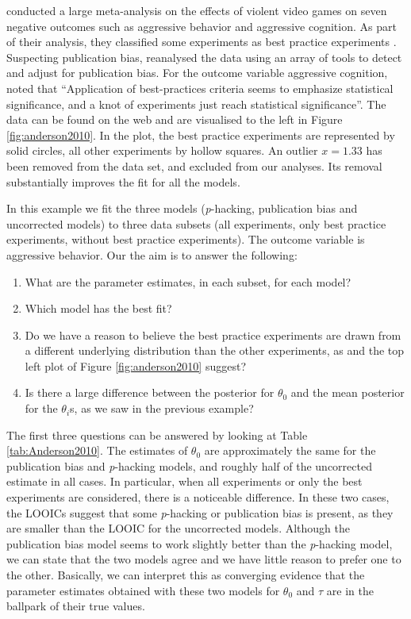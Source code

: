 \documentclass{article}
\theoremstyle{plain}
\theoremstyle{definition}
\begin{document}
\citet{anderson2010violent} conducted a large meta-analysis on the effects of violent video games on seven negative outcomes such as aggressive behavior and aggressive cognition. As part of their analysis, they classified some experiments as best practice experiments \citep[for more details, see Table 2 of][]{anderson2010violent}. Suspecting publication bias, \citet{hilgard2017overstated} reanalysed the data using an array of tools to detect and adjust for publication bias. For the outcome variable aggressive cognition, \citet{hilgard2017overstated} noted that \enquote{Application of best-practices criteria seems to emphasize statistical significance, and a knot of experiments just reach statistical significance}. The data can be found on the web \citep{Hilgard2017} and are visualised to the left in Figure \ref{fig:anderson2010}. In the plot, the best practice experiments are represented by solid circles, all other experiments by hollow squares. An outlier $x=1.33$ has been removed from the data set, and excluded from our analyses. Its removal substantially improves the fit for all the models. 

In this example we fit the three models (\textit{p}-hacking, publication bias and uncorrected models) to three data subsets (all experiments, only best practice experiments, without best practice experiments). The outcome variable is aggressive behavior. Our the aim is to answer the following:
\begin{enumerate}
\item What are the parameter estimates, in each subset, for each model?
\item Which model has the best fit?
\item Do we have a reason to believe the best practice experiments are drawn from a different underlying distribution than the other experiments, as \citet{hilgard2017overstated} and the top left plot of Figure \ref{fig:anderson2010} suggest?
\item Is there a large difference between the posterior for $\theta_{0}$ and the mean posterior for the $\theta_{i}$s, as we saw in the previous example?
\end{enumerate}



The first three questions can be answered by looking at Table \ref{tab:Anderson2010}. The estimates of $\theta_{0}$ are approximately the same for the publication bias and \textit{p}-hacking models, and roughly half of the uncorrected estimate in all cases. In particular, when all experiments or only the best experiments are considered, there is a noticeable difference. In these two cases, the LOOICs suggest that some \textit{p}-hacking or publication bias is present, as they are smaller than the LOOIC for the uncorrected models. Although the publication bias model seems to work slightly better than the \textit{p}-hacking model, we can state that the two models agree and we have little reason to prefer one to the other. Basically, we can interpret this as converging evidence that the parameter estimates obtained with these two models for $\theta_{0}$ and $\tau$ are in the ballpark of their true values.
\end{document}
